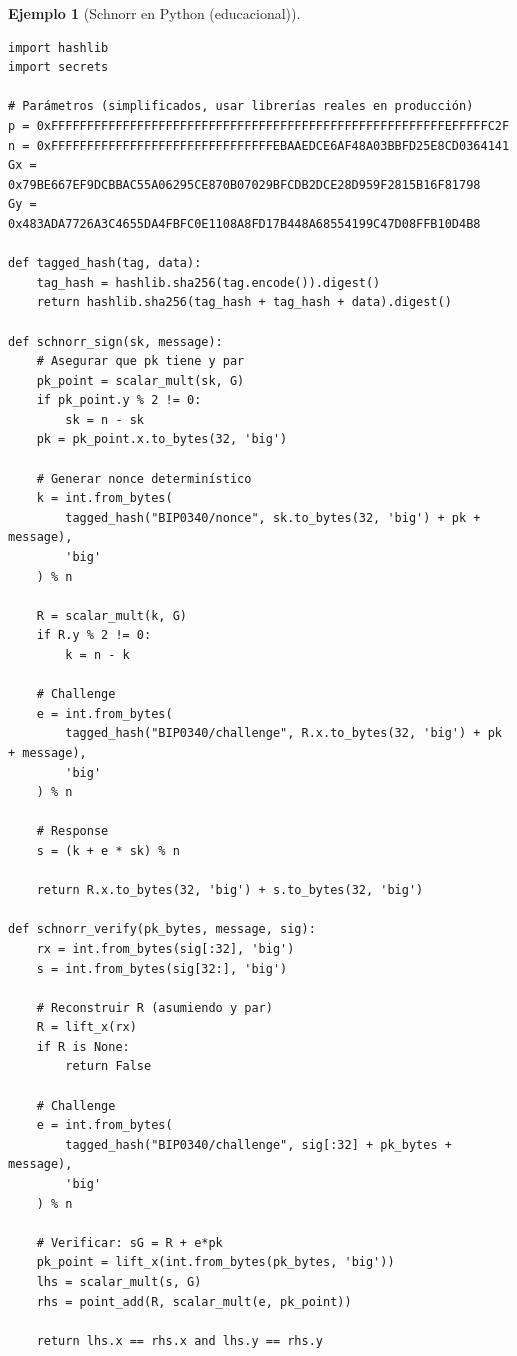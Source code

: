 \documentclass[11pt,a4paper,twoside,openright]{book}
\theoremstyle{definition}
\newtheorem{example}{Ejemplo}[chapter]
\theoremstyle{plain}
\theoremstyle{remark}
\begin{document}
\begin{example}[Schnorr en Python (educacional)]
\begin{verbatim}
import hashlib
import secrets

# Parámetros (simplificados, usar librerías reales en producción)
p = 0xFFFFFFFFFFFFFFFFFFFFFFFFFFFFFFFFFFFFFFFFFFFFFFFFFFFFFFFEFFFFFC2F
n = 0xFFFFFFFFFFFFFFFFFFFFFFFFFFFFFFFEBAAEDCE6AF48A03BBFD25E8CD0364141
Gx = 0x79BE667EF9DCBBAC55A06295CE870B07029BFCDB2DCE28D959F2815B16F81798
Gy = 0x483ADA7726A3C4655DA4FBFC0E1108A8FD17B448A68554199C47D08FFB10D4B8

def tagged_hash(tag, data):
    tag_hash = hashlib.sha256(tag.encode()).digest()
    return hashlib.sha256(tag_hash + tag_hash + data).digest()

def schnorr_sign(sk, message):
    # Asegurar que pk tiene y par
    pk_point = scalar_mult(sk, G)
    if pk_point.y % 2 != 0:
        sk = n - sk
    pk = pk_point.x.to_bytes(32, 'big')
    
    # Generar nonce determinístico
    k = int.from_bytes(
        tagged_hash("BIP0340/nonce", sk.to_bytes(32, 'big') + pk + message),
        'big'
    ) % n
    
    R = scalar_mult(k, G)
    if R.y % 2 != 0:
        k = n - k
    
    # Challenge
    e = int.from_bytes(
        tagged_hash("BIP0340/challenge", R.x.to_bytes(32, 'big') + pk + message),
        'big'
    ) % n
    
    # Response
    s = (k + e * sk) % n
    
    return R.x.to_bytes(32, 'big') + s.to_bytes(32, 'big')

def schnorr_verify(pk_bytes, message, sig):
    rx = int.from_bytes(sig[:32], 'big')
    s = int.from_bytes(sig[32:], 'big')
    
    # Reconstruir R (asumiendo y par)
    R = lift_x(rx)
    if R is None:
        return False
    
    # Challenge
    e = int.from_bytes(
        tagged_hash("BIP0340/challenge", sig[:32] + pk_bytes + message),
        'big'
    ) % n
    
    # Verificar: sG = R + e*pk
    pk_point = lift_x(int.from_bytes(pk_bytes, 'big'))
    lhs = scalar_mult(s, G)
    rhs = point_add(R, scalar_mult(e, pk_point))
    
    return lhs.x == rhs.x and lhs.y == rhs.y
\end{verbatim}
\end{example}
\end{document}
